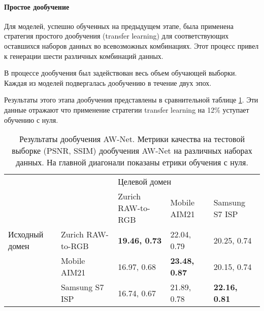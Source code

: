 \paragraph{Простое дообучение}

Для моделей, успешно обученных на предыдущем этапе, была применена стратегия простого дообучения (transfer learning) для соответствующих оставшихся наборов данных во всевозможных комбинациях. Этот процесс привел к генерации шести различных комбинаций данных.

В процессе дообучения был задействован весь объем обучающей выборки. Каждая из моделей подвергалась дообучению в течение двух эпох.

Результаты этого этапа дообучения представлены в сравнительной таблице \ref{tab:tl}. Эти данные отражают что применение стратегии transfer learning на 12\% уступает обучению с нуля.

\begin{table}[H]
    \caption{Результаты дообучения AW-Net. Метрики качества на тестовой выборке (PSNR, SSIM) дообучения AW-Net на различных наборах данных. На главной диагонали показаны етрики обучения с нуля.}\label{tab:tl}
    \begin{tabular}{|p{3cm}p{3cm}|p{3cm}p{3cm}p{3cm}|}
        \hline
        \multicolumn{2}{|p{3cm}|}{\multirow{2}{*}{}}                     & \multicolumn{3}{p{5cm}|}{Целевой домен}                                                                                \\ \cline{3-5} 
        \multicolumn{2}{|p{3cm}|}{}                                      & \multicolumn{1}{p{3cm}|}{Zurich RAW-to-RGB}    & \multicolumn{1}{p{3cm}|}{Mobile AIM21}         & Samsung S7 ISP       \\ \hline
        \multicolumn{1}{|p{3cm}|}{Исходный домен}    & Zurich RAW-to-RGB & \multicolumn{1}{p{3cm}|}{\textbf{19.46, 0.73}} & \multicolumn{1}{p{3cm}|}{22.04, 0.79}          & 20.25, 0.74          \\ \cline{2-5} 
        \multicolumn{1}{|p{3cm}|}{}                  & Mobile AIM21      & \multicolumn{1}{p{3cm}|}{16.97, 0.68}          & \multicolumn{1}{p{3cm}|}{\textbf{23.48, 0.87}} & 20.15, 0.74          \\ \cline{2-5} 
        \multicolumn{1}{|p{3cm}|}{}                  & Samsung S7 ISP    & \multicolumn{1}{p{3cm}|}{16.74, 0.67}          & \multicolumn{1}{p{3cm}|}{21.89, 0.78}          & \textbf{22.16, 0.81} \\ \hline
    \end{tabular}
\end{table}

